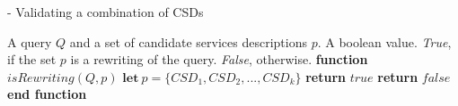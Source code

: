 %

\begin{algorithm}[h!]
\caption{ - Validating a combination of CSDs}
\label{isrewriting}
\begin{algorithmic}[1]
\REQUIRE A query $Q$ and a set of candidate services descriptions $p$.
\ENSURE A boolean value. \textit{True}, if the set $p$ is a rewriting of the query. \textit{False}, otherwise.
\STATE \textbf{function} $\mathit{isRewriting} (Q, p)$
\STATE  $\mathbf{let} \ p = \lbrace CSD_{1}, CSD_{2}, ..., CSD_{k} \rbrace$
	\STATE \textbf{return} $true$		
\ENDIF
\STATE \textbf{return} $false$
\STATE \textbf{end function}
\end{algorithmic}
\end{algorithm}

